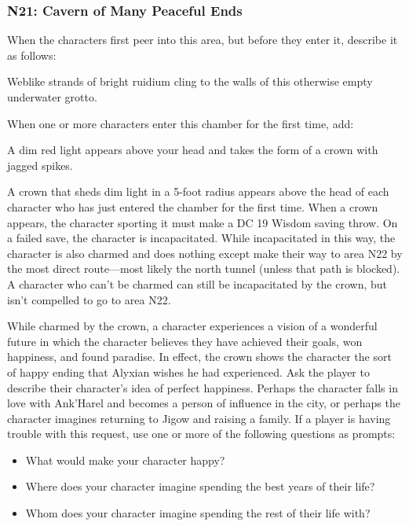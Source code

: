 \documentclass[10pt,a4paper,twoside,bg=print,twocolumn,openany,nodeprecatedcode]{dndbook}
\begin{document}
\subsubsection{N21: Cavern of Many Peaceful Ends}
When the characters first peer into this area, but before they enter it, describe it as follows:

\begin{DndReadAloud}{}
Weblike strands of bright ruidium cling to the walls of this otherwise empty underwater grotto.

\end{DndReadAloud}

When one or more characters enter this chamber for the first time, add:

\begin{DndReadAloud}{}
A dim red light appears above your head and takes the form of a crown with jagged spikes.

\end{DndReadAloud}

A crown that sheds dim light in a 5-foot radius appears above the head of each character who has just entered the chamber for the first time. When a crown appears, the character sporting it must make a DC 19 Wisdom saving throw. On a failed save, the character is incapacitated. While incapacitated in this way, the character is also charmed and does nothing except make their way to area N22 by the most direct route—most likely the north tunnel (unless that path is blocked). A character who can't be charmed can still be incapacitated by the crown, but isn't compelled to go to area N22.

While charmed by the crown, a character experiences a vision of a wonderful future in which the character believes they have achieved their goals, won happiness, and found paradise. In effect, the crown shows the character the sort of happy ending that Alyxian wishes he had experienced. Ask the player to describe their character's idea of perfect happiness. Perhaps the character falls in love with Ank'Harel and becomes a person of influence in the city, or perhaps the character imagines returning to Jigow and raising a family. If a player is having trouble with this request, use one or more of the following questions as prompts:


\begin{itemize}
\item What would make your character happy?
\item Where does your character imagine spending the best years of their life?
\item Whom does your character imagine spending the rest of their life with?
\end{itemize}
\end{document}
